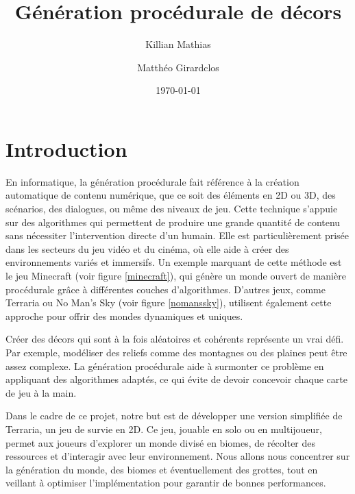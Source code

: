 \documentclass[12pt]{article}
\author{Killian Mathias}{I}
\author{Matthéo Girardclos}{II}
\title{Génération procédurale de décors}
\date{\today}
\begin{document}
\maketitle
\newpage

\tableofcontents
\newpage

\section{Introduction}

En informatique, la génération procédurale fait référence à la création automatique de contenu numérique, que ce soit des éléments en 2D ou 3D, des scénarios, des dialogues, ou même des niveaux de jeu. Cette technique s'appuie sur des algorithmes qui permettent de produire une grande quantité de contenu sans nécessiter l'intervention directe d'un humain. Elle est particulièrement prisée dans les secteurs du jeu vidéo et du cinéma, où elle aide à créer des environnements variés et immersifs.  Un exemple marquant de cette méthode est le jeu Minecraft (voir figure \ref{minecraft}), qui génère un monde ouvert de manière procédurale grâce à différentes couches d'algorithmes. D'autres jeux, comme Terraria ou No Man’s Sky (voir figure \ref{nomanssky}), utilisent également cette approche pour offrir des mondes dynamiques et uniques.\par
Créer des décors qui sont à la fois aléatoires et cohérents représente un vrai défi. Par exemple, modéliser des reliefs comme des montagnes ou des plaines peut être assez complexe. La génération procédurale aide à surmonter ce problème en appliquant des algorithmes adaptés, ce qui évite de devoir concevoir chaque carte de jeu à la main.\par
Dans le cadre de ce projet, notre but est de développer une version simplifiée de Terraria, un jeu de survie en 2D. Ce jeu, jouable en solo ou en multijoueur, permet aux joueurs d'explorer un monde divisé en biomes, de récolter des ressources et d'interagir avec leur environnement. Nous allons nous concentrer sur la génération du monde, des biomes et éventuellement des grottes, tout en veillant à optimiser l'implémentation pour garantir de bonnes performances.
\end{document}
